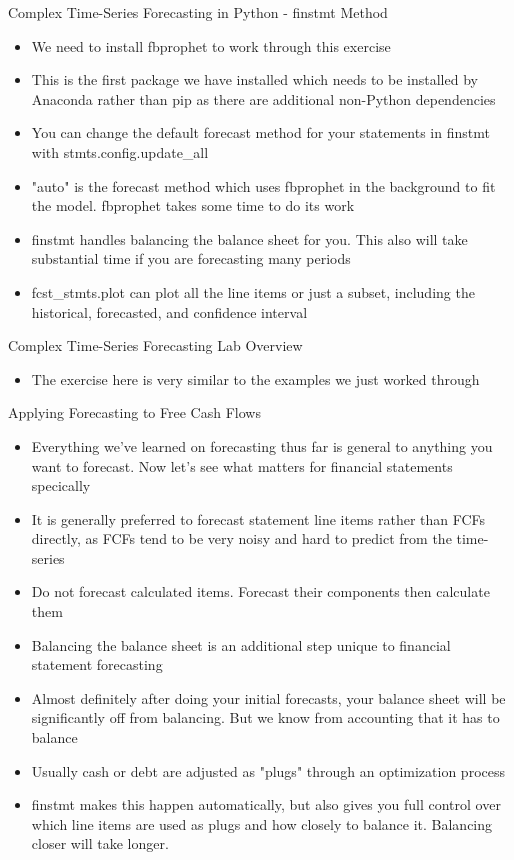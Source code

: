\documentclass[]{article}
\begin{document}
\begin{section}{Complex Time-Series Forecasting in Python - finstmt Method}
\begin{itemize}
\item We need to install fbprophet to work through this exercise
\item This is the first package we have installed which needs to be installed by Anaconda rather than pip as there are additional non-Python dependencies
\item You can change the default forecast method for your statements in finstmt with stmts.config.update\_all
\item "auto" is the forecast method which uses fbprophet in the background to fit the model. fbprophet takes some time to do its work
\item finstmt handles balancing the balance sheet for you. This also will take substantial time if you are forecasting many periods
\item fcst\_stmts.plot can plot all the line items or just a subset, including the historical, forecasted, and confidence interval
\end{itemize}
\end{section}
\begin{section}{Complex Time-Series Forecasting Lab Overview}
\begin{itemize}
\item The exercise here is very similar to the examples we just worked through
\end{itemize}
\end{section}
\begin{section}{Applying Forecasting to Free Cash Flows}
\begin{itemize}
\item Everything we've learned on forecasting thus far is general to anything you want to forecast. Now let's see what matters for financial statements specically
\item It is generally preferred to forecast statement line items rather than FCFs directly, as FCFs tend to be very noisy and hard to predict from the time-series
\item Do not forecast calculated items. Forecast their components then calculate them
\item Balancing the balance sheet is an additional step unique to financial statement forecasting
\item Almost definitely after doing your initial forecasts, your balance sheet will be significantly off from balancing. But we know from accounting that it has to balance
\item Usually cash or debt are adjusted as "plugs" through an optimization process
\item finstmt makes this happen automatically, but also gives you full control over which line items are used as plugs and how closely to balance it. Balancing closer will take longer.
\end{itemize}
\end{section}
\end{document}
